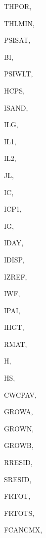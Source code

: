 {\begin{DoxyParamCaption}
\item[{real, dimension (ilg,ig)}]{T\+H\+P\+O\+R, }
\item[{real, dimension(ilg,ig)}]{T\+H\+L\+M\+I\+N, }
\item[{real, dimension(ilg,ig)}]{P\+S\+I\+S\+A\+T, }
\item[{real, dimension    (ilg,ig)}]{B\+I, }
\item[{real, dimension(ilg,ig)}]{P\+S\+I\+W\+L\+T, }
\item[{real, dimension  (ilg,ig)}]{H\+C\+P\+S, }
\item[{integer, dimension (ilg,ig)}]{I\+S\+A\+N\+D, }
\item[{integer}]{I\+L\+G, }
\item[{integer}]{I\+L1, }
\item[{integer}]{I\+L2, }
\item[{integer}]{J\+L, }
\item[{integer}]{I\+C, }
\item[{integer}]{I\+C\+P1, }
\item[{integer}]{I\+G, }
\item[{integer}]{I\+D\+A\+Y, }
\item[{integer}]{I\+D\+I\+S\+P, }
\item[{integer}]{I\+Z\+R\+E\+F, }
\item[{integer}]{I\+W\+F, }
\item[{integer}]{I\+P\+A\+I, }
\item[{integer}]{I\+H\+G\+T, }
\item[{real, dimension (ilg,ic,ig)}]{R\+M\+A\+T, }
\item[{real, dimension     (ilg,ic)}]{H, }
\item[{real, dimension    (ilg,ic)}]{H\+S, }
\item[{real, dimension(ilg)}]{C\+W\+C\+P\+A\+V, }
\item[{real, dimension (ilg)}]{G\+R\+O\+W\+A, }
\item[{real, dimension (ilg)}]{G\+R\+O\+W\+N, }
\item[{real, dimension (ilg)}]{G\+R\+O\+W\+B, }
\item[{real, dimension(ilg)}]{R\+R\+E\+S\+I\+D, }
\item[{real, dimension(ilg)}]{S\+R\+E\+S\+I\+D, }
\item[{real, dimension (ilg)}]{F\+R\+T\+O\+T, }
\item[{real, dimension(ilg)}]{F\+R\+T\+O\+T\+S, }
\item[{real, dimension(ilg,ictem)}]{F\+C\+A\+N\+C\+M\+X, }

\end{DoxyParamCaption}}
